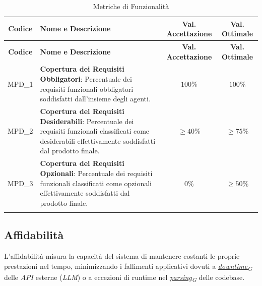 \documentclass[12pt, a4paper]{article}
\newcommand{\urlglossario}{https://skynetunigroup.github.io/Code_Guardian/Documentazione/PB/glossario_v2.0.0.pdf} %
\newcommand{\glo}[2]{\href{\urlglossario\#nameddest=#2}{#1\textsubscript{G}}}
\newlength{\LargColVal} %
\begin{document}
\renewcommand{\arraystretch}{1.3}
\begin{xltabular}{\textwidth}{|c|X|C{\LargColVal}|C{\LargColVal}|}

    \hline
    \textbf{Codice} & \textbf{Nome e Descrizione} & \textbf{Val. Accettazione} & \textbf{Val. Ottimale} \\ \hline
    \endfirsthead

    \hline
    \textbf{Codice} & \textbf{Nome e Descrizione} & \textbf{Val. Accettazione} & \textbf{Val. Ottimale} \\ \hline
    \endhead

    MPD\_1 & \textbf{Copertura dei Requisiti Obbligatori}: Percentuale dei requisiti funzionali obbligatori soddisfatti dall'insieme degli agenti. & $100\%$ & $100\%$ \\ \hline
    MPD\_2 & \textbf{Copertura dei Requisiti Desiderabili}: Percentuale dei requisiti funzionali classificati come desiderabili effettivamente soddisfatti dal prodotto finale. & $\ge 40\%$ & $\ge75\%$ \\ \hline
    MPD\_3 & \textbf{Copertura dei Requisiti Opzionali}: Percentuale dei requisiti funzionali classificati come opzionali effettivamente soddisfatti dal prodotto finale. & $0\%$ & $\ge 50\%$ \\ \hline

    \caption{Metriche di Funzionalità}
    \label{tab:prod_funzionalita}
\end{xltabular}

\subsection{Affidabilità}
L'affidabilità misura la capacità del sistema di mantenere costanti le proprie prestazioni nel tempo, minimizzando i fallimenti applicativi dovuti a \textit{\glo{downtime}{downtime}} delle \textit{API} esterne (\textit{LLM}) o a eccezioni di runtime nel \textit{\glo{parsing}{parsing}} delle codebase.
\end{document}
